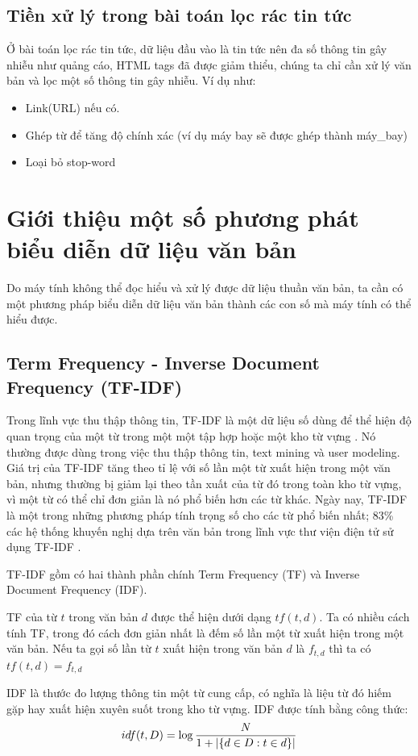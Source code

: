 \subsection{Tiền xử lý trong bài toán lọc rác tin tức}
  Ở bài toán lọc rác tin tức, dữ liệu đầu vào là tin tức nên đa số thông tin gây nhiễu như quảng cáo, HTML tags đã được giảm thiểu, chúng ta chỉ cần xử lý văn bản và lọc một số thông tin gây nhiễu. Ví dụ như:
  \begin{itemize}
    \item Link(URL) nếu có.
    \item Ghép từ để tăng độ chính xác (ví dụ máy bay sẽ được ghép thành máy\_bay)
    \item Loại bỏ stop-word
  \end{itemize}
\section{Giới thiệu một số phương phát biểu diễn dữ liệu văn bản} \label{distances}
Do máy tính không thể đọc hiểu và xử lý được dữ liệu thuần văn bản, ta cần có một phương pháp biểu diễn dữ liệu văn bản thành các con số mà máy tính có thể hiểu được.
\subsection*{Term Frequency - Inverse Document Frequency (TF-IDF)}
Trong lĩnh vực thu thập thông tin, TF-IDF là một dữ liệu số dùng để thể hiện độ quan trọng của một từ trong một một tập hợp hoặc một kho từ vựng \cite{rajaraman_ullman_2011}. Nó thường được dùng trong việc thu thập thông tin, text mining và user modeling. Giá trị của TF-IDF tăng theo tỉ lệ với số lần một từ xuất hiện trong một văn bản, nhưng thường bị giảm lại theo tần xuất của từ đó trong toàn kho từ vựng, vì một từ có thể chỉ đơn giản là nó phổ biến hơn các từ khác. Ngày nay, TF-IDF là một trong những phương pháp tính trọng số cho các từ phổ biến nhất; 83\% các hệ thống khuyến nghị dựa trên văn bản trong lĩnh vực thư viện điện tử sử dụng TF-IDF \cite{Beel2016}.

TF-IDF gồm có hai thành phần chính Term Frequency (TF) và Inverse Document Frequency (IDF).

TF của từ $t$ trong văn bản $d$ được thể hiện dưới dạng $tf(t,d)$. Ta có nhiều cách tính TF, trong đó cách đơn giản nhất là đếm số lần một từ xuất hiện trong một văn bản. Nếu ta gọi số lần từ $t$ xuất hiện trong văn bản $d$ là $f_{t,d}$ thì ta có $tf(t,d) = f_{t,d}$

IDF là thước đo lượng thông tin một từ cung cấp, có nghĩa là liệu từ đó hiếm gặp hay xuất hiện xuyên suốt trong kho từ vựng. IDF được tính bằng công thức:
\begin{equation}
  idf(t, D) = \log\frac{N}{1 + \abs{\{d \in D: t \in d\}}}
\end{equation}

